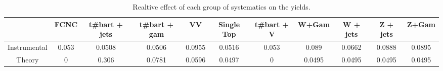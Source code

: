 \begin{table}[htbp]
\begin{center}
\begin{tabular}{|c|c|c|c|c|c|c|c|c|c|c|}
\hline 
      & FCNC      & t#bar{t} + jets      & t#bar{t} +  gam      & VV      & Single Top      & t#bar{t} + V      & W+Gam      & W + jets      & Z + jets      & Z+Gam \\ 
\hline 
 Instrumental & 0.053 & 0.0508 & 0.0506 & 0.0955 & 0.0516 & 0.053 & 0.089 & 0.0662 & 0.0888 & 0.0895 \\ 
 Theory & 0 & 0.306 & 0.0781 & 0.0596 & 0.0497 & 0 & 0.0495 & 0.0495 & 0.0495 & 0.0495 \\ 
\hline 
\end{tabular} 
\caption{Realtive effect of each group of systematics on the yields.} 
\end{center} 
\end{table} 
